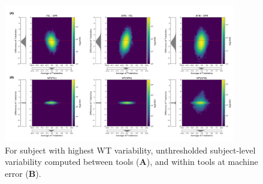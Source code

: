 \documentclass[11pt,onecolumn]{article}
\begin{document}
\begin{figure}[ht]
  \centering
  \includegraphics[width=0.9\textwidth]{figures/plots/Bland-Altman/unthresh-sbj05.png}
  \caption{For subject with highest WT variability,
    unthresholded subject-level variability computed between tools (\textbf{A}), and within tools at machine error (\textbf{B}).}
  \label{fig:unthresh-maps-sbj}
\end{figure}

\end{document}
